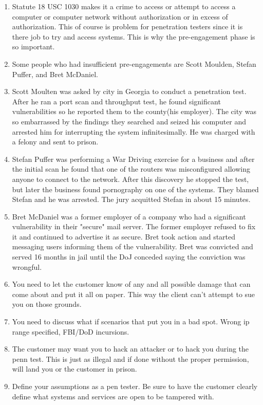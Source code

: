 \documentclass[12pt]{extarticle}
\begin{document}
\begin{enumerate}
\item Statute 18 USC 1030 makes it a crime to access or attempt to access a computer or computer network without authorization or in excess of authorization. This of course is problem for penetration testers since it is there job to try and access systems. This is why the pre-engagement phase is so important. \cite{Ref:Legal1}
\item Some people who had insufficient pre-engagements are Scott Moulden, Stefan Puffer, and Bret McDaniel. \cite{Ref:Legal1}
\item Scott Moulten was asked by city in Georgia to conduct a penetration test. After he ran a port scan and throughput test, he found significant vulnerabilities so he reported them to the county(his employer). The city was so embarrassed by the findings they searched and seized his computer and arrested him for interrupting the system infinitesimally. He was charged with a felony and sent to prison. \cite{Ref:Legal1}
\item Stefan Puffer was performing a War Driving exercise for a business and after the initial scan he found that one of the routers was misconfigured allowing anyone to connect to the network. After this discovery he stopped the test, but later the business found pornography on one of the systems. They blamed Stefan and he was arrested. The jury acquitted Stefan in about 15 minutes. \cite{Ref:Legal1}
\item Bret McDaniel was a former employer of a company who had a significant vulnerability in their "secure" mail server. The former employer refused to fix it and continued to advertise it as secure. Bret took action and started messaging users informing them of the vulnerability. Bret was convicted and served 16 months in jail until the DoJ conceded saying the conviction was wrongful. \cite{Ref:Legal1}
\item You need to let the customer know of any and all possible damage that can come about and put it all on paper. This way the client can't attempt to sue you on those grounds. \cite{Ref:Legal1}
\item You need to discuss what if scenarios that put you in a bad spot. Wrong ip range specified, FBI/DoD incursions. \cite{Ref:Legal1}
\item The customer may want you to hack an attacker or to hack you during the penn test. This is just as illegal and if done without the proper permission, will land you or the customer in prison. \cite{Ref:Legal1}
\item Define your assumptions as a pen tester. Be sure to have the customer clearly define what systems and services are open to be tampered with. \cite{Ref:Legal1}
\end{enumerate}
\end{document}
